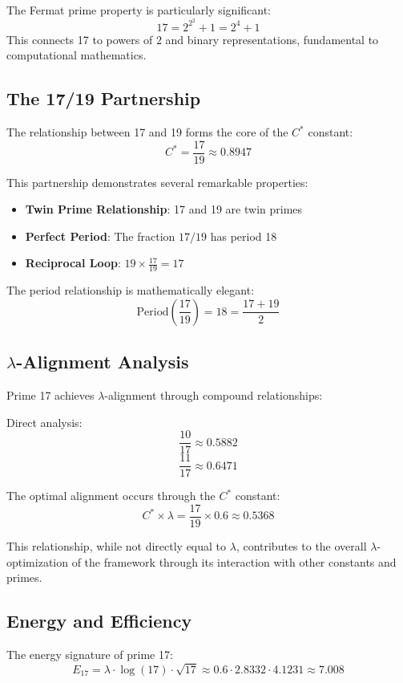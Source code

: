 \documentclass[12pt,a4paper]{report}
\newcommand{\Cstar}{C^*}
\begin{document}
The Fermat prime property is particularly significant:
\[
17 = 2^{2^2} + 1 = 2^4 + 1
\]
This connects 17 to powers of 2 and binary representations, fundamental to computational mathematics.

\subsection{The 17/19 Partnership}

The relationship between 17 and 19 forms the core of the $\Cstar$ constant:
\[
\Cstar = \frac{17}{19} \approx 0.8947
\]

This partnership demonstrates several remarkable properties:

\begin{itemize}
\item \textbf{Twin Prime Relationship}: 17 and 19 are twin primes
\item \textbf{Perfect Period}: The fraction $17/19$ has period 18
\item \textbf{Reciprocal Loop}: $19 \times \frac{17}{19} = 17$
\end{itemize}

The period relationship is mathematically elegant:
\[
\text{Period}\left(\frac{17}{19}\right) = 18 = \frac{17 + 19}{2}
\]

\subsection{$\lambda$-Alignment Analysis}

Prime 17 achieves $\lambda$-alignment through compound relationships:

Direct analysis:
\[
\frac{10}{17} \approx 0.5882
\]
\[
\frac{11}{17} \approx 0.6471
\]

The optimal alignment occurs through the $\Cstar$ constant:
\[
\Cstar \times \lambda = \frac{17}{19} \times 0.6 \approx 0.5368
\]

This relationship, while not directly equal to $\lambda$, contributes to the overall $\lambda$-optimization of the framework through its interaction with other constants and primes.

\subsection{Energy and Efficiency}

The energy signature of prime 17:
\[
E_{17} = \lambda \cdot \log(17) \cdot \sqrt{17} \approx 0.6 \cdot 2.8332 \cdot 4.1231 \approx 7.008
\]
\end{document}
